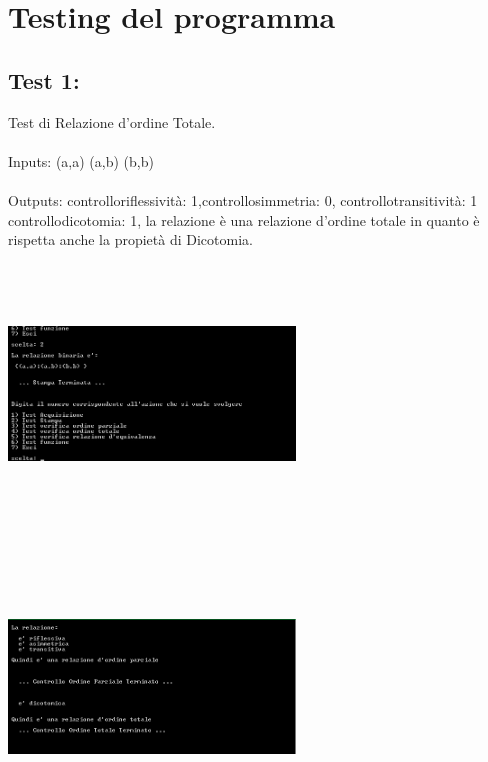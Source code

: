 \documentclass[11pt, a4paper, titlepage, block]{article}
\begin{document}
	\newpage
	\section{Testing del programma}
	\subsection{Test 1:}
	Test di Relazione d'ordine Totale.\\
	\\
	Inputs:  (a,a)  (a,b)  (b,b) \\
	\\
	Outputs: controlloriflessivit\`a:  1,controllosimmetria:  0, controllotransitivit\`a:  1
	controllodicotomia:  1, la relazione \`e una relazione d'ordine totale in quanto \`e rispetta anche la propiet\`a di Dicotomia.\\
	\includegraphics[width=3in,height=3in,viewport=0 0 300 300]{../Screenshots/Test1Input.jpg}
	\\
	\includegraphics[width=3in,height=3in,viewport=0 0 300 300]{../Screenshots/Test1Output.png}
	\newpage
\end{document}
